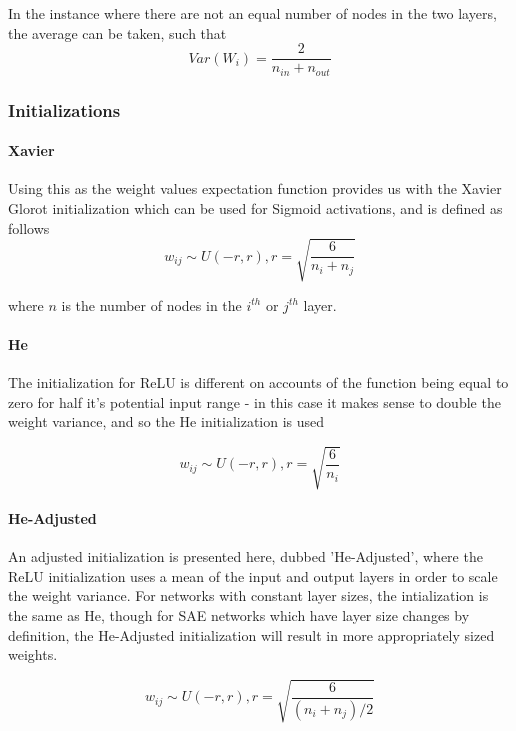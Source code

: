 \documentclass[a4paper,11pt,oneside]{article}
\theoremstyle{plain}
\theoremstyle{definition}
\begin{document}
In the instance where there are not an equal number of nodes in the two layers, the average can be taken, such that
 \begin{equation}
Var(W_i) = \frac{2}{n_{in} + n_{out}}
\end{equation}

\subsubsection{Initializations}

\paragraph{Xavier} Using this as the weight values expectation function provides us with the Xavier Glorot initialization \cite{Glorot} which can be used for Sigmoid activations, and is defined as follows
\begin{equation}
w_{ij} \sim U(-r, r), r = \sqrt{\frac{6}{n_i + n_j}}
\end{equation}

where $n$ is the number of nodes in the $i^{th}$ or $j^{th}$ layer.
\newline\newline
\paragraph{He} The initialization for ReLU is different on accounts of the function being equal to zero for half it's potential input range - in this case it makes sense to double the weight variance, and so the He \cite{He} initialization is used

\begin{equation}
w_{ij} \sim U(-r, r), r = \sqrt{\frac{6}{n_i}}
\end{equation}


\paragraph{He-Adjusted} An adjusted initialization is presented here, dubbed 'He-Adjusted', where the ReLU initialization uses a mean of the input and output layers in order to scale the weight variance. For networks with constant layer sizes, the intialization is the same as He, though for SAE networks which have layer size changes by definition, the He-Adjusted initialization will result in more appropriately sized weights.

\begin{equation}
w_{ij} \sim U(-r, r), r = \sqrt{\frac{6}{(n_i + n_j)/2}}
\end{equation}
\end{document}
